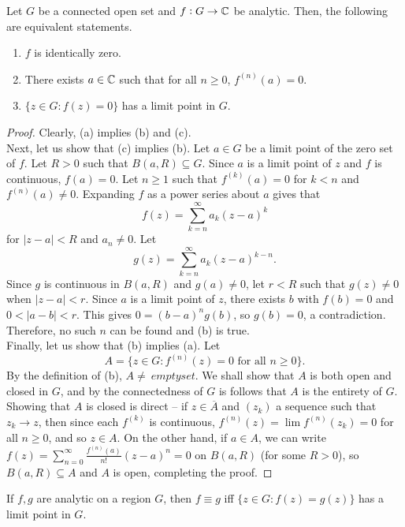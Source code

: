 	\begin{ftheo}
		Let $G$ be a connected open set and $f : G \to \mathbb{C}$ be analytic. Then, the following are equivalent statements.
		\begin{enumerate}[label=(\alph*)]
			\item $f$ is identically zero.
			\item There exists $a \in \mathbb{C}$ such that for all $n \ge 0$, $f^{(n)}(a) = 0$.
			\item $\{ z \in G : f(z) = 0 \}$ has a limit point in $G$.
		\end{enumerate}
	\end{ftheo}
	\begin{proof}
		Clearly, (a) implies (b) and (c).\\
		Next, let us show that (c) implies (b). Let $a \in G$ be a limit point of the zero set of $f$. Let $R > 0$ such that $B(a,R) \subseteq G$. Since $a$ is a limit point of $z$ and $f$ is continuous, $f(a) = 0$. Let $n \ge 1$ such that $f^{(k)}(a) = 0$ for $k < n$ and $f^{(n)}(a) \ne 0$. Expanding $f$ as a power series about $a$ gives that
		\[ f(z) = \sum_{k=n}^\infty a_k (z-a)^{k} \]
		for $|z-a| < R$ and $a_n \ne 0$. Let
		\[ g(z) = \sum_{k=n}^\infty a_k (z-a)^{k-n}. \]
		Since $g$ is continuous in $B(a,R)$ and $g(a) \ne 0$, let $r<R$ such that $g(z) \ne 0$ when $|z-a| < r$. Since $a$ is a limit point of $z$, there exists $b$ with $f(b) = 0$ and $0 < |a-b| < r$. This gives $0 = (b-a)^n g(b)$, so $g(b) = 0$, a contradiction. Therefore, no such $n$ can be found and (b) is true.\\
		Finally, let us show that (b) implies (a). Let
		\[ A = \{ z \in G : f^{(n)}(z) = 0 \text{ for all } n \ge 0 \}. \]
		By the definition of (b), $A \ne \ emptyset$. We shall show that $A$ is both open and closed in $G$, and by the connectedness of $G$ is follows that $A$ is the entirety of $G$. Showing that $A$ is closed is direct -- if $z \in \overline{A}$ and $(z_k)$ a sequence such that $z_k \to z$, then since each $f^{(k)}$ is continuous, $f^{(n)}(z) = \lim f^{(n)}(z_k) = 0$ for all $n \ge 0$, and so $z \in A$. On the other hand, if $a \in A$, we can write $f(z) = \sum_{n = 0}^\infty \frac{f^{(n)}(a)}{n!} (z-a)^n = 0$ on $B(a,R)$ (for some $R > 0$), so $B(a,R) \subseteq A$ and $A$ is open, completing the proof.
	\end{proof}

	\begin{corollary}
		If $f,g$ are analytic on a region $G$, then $f \equiv g$ iff $\{ z \in G : f(z) = g(z) \}$ has a limit point in $G$.
	\end{corollary}

